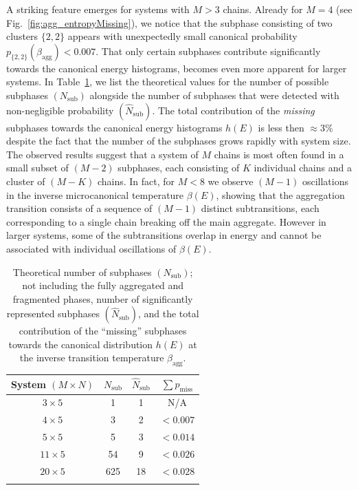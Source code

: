 \documentclass[12pt]{report}
\begin{document}
%
A striking feature emerges for systems with $M > 3$ chains. Already for $M = 4$ (see Fig.~\ref{fig:agg_entropyMissing}), we notice that the subphase consisting of two clusters $\{2,2\}$ appears with unexpectedly small canonical probability $p_{\{2,2\}}(\beta_{\mathrm{agg}}) < 0.007$. That only certain subphases contribute significantly towards the canonical energy histograms, becomes even more apparent for larger systems. In Table~\ref{tab:agg_Tab_2}, we list the theoretical values for the number of possible subphases $(N_{\mathrm{sub}})$ alongside the number of subphases that were detected with non-negligible probability $(\hat{N}_{\mathrm{sub}})$. The total contribution of the \textit{missing} subphases towards the canonical energy histograms $h(E)$ is less then $\approx 3\%$ despite the fact that the number of the subphases grows rapidly with system size. The observed results suggest that a system of $M$ chains is most often found in a small subset of $(M-2)$ subphases, each consisting of $K$ individual chains and a cluster of $(M - K)$ chains. In fact, for $M<8$ we observe $(M-1)$ oscillations in the inverse microcanonical temperature $\beta(E)$, showing that the aggregation transition consists of a sequence of $(M-1)$ distinct subtransitions, each corresponding to a single chain breaking off the main aggregate. However in larger systems, some of the subtransitions overlap in energy and cannot be associated with individual oscillations of $\beta(E)$.
%

%
\begin{table}
\caption{\label{tab:agg_Tab_2}%
Theoretical number of subphases $(N_{\mathrm{sub}})$; not including the fully aggregated and fragmented phases, number of significantly represented subphases $(\hat{N}_{\mathrm{sub}})$, and the total contribution of the ``missing'' subphases towards the canonical distribution $h(E)$ at the inverse transition temperature $\beta_{\mathrm{agg}}$.}
\begin{tabular*}{\hsize}{@{\extracolsep{\fill}}cccc@{}}
\hline
\hline
System $(M \times N)$ & $N_{\mathrm{sub}}$ &$\hat{N}_{\mathrm{sub}}$ & $\sum p_{\mathrm{miss}}$\\
\hline
$3  \times 5$	&	1 	&	1  	& N/A\\
$4  \times 5$	&	3 	&	2  	&  $< 0.007$\\
$5  \times 5$	&	5 	&	3  	&  $< 0.014$\\
$11 \times 5$	&	54 	&	9  	&  $< 0.026$\\
$20 \times 5$	&	625 	& 	18	&  $< 0.028$\\
\\
\hline
\hline
\end{tabular*}
\end{table}
%
\end{document}
